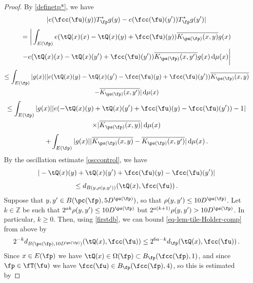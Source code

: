     \begin{proof}
        By \eqref{definetp*}, we have
        $$
            |e(\fcc(\fu)(y)) T_{\fp}^* g(y) - e(\fcc(\fu)(y')) T_{\fp}^* g(y')|
        $$
        \begin{multline*}
            =\bigg| \int_{E(\fp)} e(\tQ(x)(x) - \tQ(x)(y) + \fcc(\fu)(y)) \overline{K_{\ps(\fp)}(x, y)} g(x) \\
            - e(\tQ(x)(x) - \tQ(x)(y') + \fcc(\fu)(y')) \overline{K_{\ps(\fp)}(x, y')} g(x) \, \mathrm{d}\mu(x)\bigg|
        \end{multline*}
        \begin{multline*}
            \leq\int_{E(\fp)} |g(x)| |e(\tQ(x)(y) - \tQ(x)(y') - \fcc(\fu)(y) + \fcc(\fu)(y'))\overline{K_{\ps(\fp)}(x, y)}\\
            - \overline{K_{\ps(\fp)}(x, y')}| \, \mathrm{d}\mu(x)
        \end{multline*}
        \begin{multline}
            \leq\int_{E(\fp)} |g(x)| |e(-\tQ(x)(y) + \tQ(x)(y') + \fcc(\fu)(y) - \fcc(\fu)(y')) - 1| \\
            \times |\overline{K_{\ps(\fp)}(x, y)}|\, \mathrm{d}\mu(x) \label{T*Holder1b}
        \end{multline}
      \begin{equation}
            + \int_{E(\fp)} |g(x)| |\overline{K_{\ps(\fp)}(x, y)} - \overline{K_{\ps(\fp)}(x, y')} |\, \mathrm{d}\mu(x)\,.\label{T*Holder1}
        \end{equation}
        By the oscillation estimate \eqref{osccontrol}, we have
        $$
            |-\tQ(x)(y) + \tQ(x)(y') + \fcc(\fu)(y) - \fcc(\fu)(y')|
        $$
      \begin{equation}
            \label{eq-lem-tile-Holder-comp}
            \le d_{B(y, \rho(y,y'))}(\tQ(x), \fcc(\fu))\,.
        \end{equation}
        Suppose that $y, y' \in B(\pc(\fp), 5D^{\ps(\fp)})$, so that $\rho(y,y') \le 10D^{\ps(\fp)}$. Let $k \in \mathbb{Z}$ be such that $2^{ak}\rho(y,y') \le 10D^{\ps(\fp)}$ but $2^{a(k+1)} \rho(y,y') > 10D^{\ps(\fp)}$. In particular, $k \ge 0$. Then, using \eqref{firstdb}, we can bound \eqref{eq-lem-tile-Holder-comp} from above by
        $$
            2^{-k} d_{B(\pc(\fp), 10 D^{\ps(\fp)})}(\tQ(x), \fcc(\fu)) \le 2^{6a - k} d_{\fp}(\tQ(x), \fcc(\fu))\,.
        $$
        Since $x \in E(\fp)$ we have $\tQ(x) \in \Omega(\fp) \subset B_{\fp}(\fcc(\fp), 1)$, and since $\fp \in \fT(\fu)$ we have $\fcc(\fu) \in B_{\fp}(\fcc(\fp), 4)$, so this is estimated by

\end{proof}
